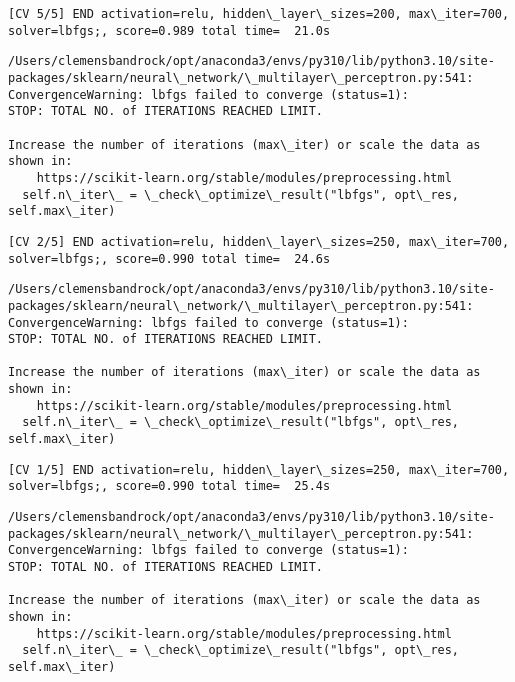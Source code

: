\documentclass[11pt]{article}
\begin{document}
    \begin{Verbatim}[commandchars=\\\{\}]
[CV 5/5] END activation=relu, hidden\_layer\_sizes=200, max\_iter=700,
solver=lbfgs;, score=0.989 total time=  21.0s
    \end{Verbatim}

    \begin{Verbatim}[commandchars=\\\{\}]
/Users/clemensbandrock/opt/anaconda3/envs/py310/lib/python3.10/site-
packages/sklearn/neural\_network/\_multilayer\_perceptron.py:541:
ConvergenceWarning: lbfgs failed to converge (status=1):
STOP: TOTAL NO. of ITERATIONS REACHED LIMIT.

Increase the number of iterations (max\_iter) or scale the data as shown in:
    https://scikit-learn.org/stable/modules/preprocessing.html
  self.n\_iter\_ = \_check\_optimize\_result("lbfgs", opt\_res, self.max\_iter)
    \end{Verbatim}

    \begin{Verbatim}[commandchars=\\\{\}]
[CV 2/5] END activation=relu, hidden\_layer\_sizes=250, max\_iter=700,
solver=lbfgs;, score=0.990 total time=  24.6s
    \end{Verbatim}

    \begin{Verbatim}[commandchars=\\\{\}]
/Users/clemensbandrock/opt/anaconda3/envs/py310/lib/python3.10/site-
packages/sklearn/neural\_network/\_multilayer\_perceptron.py:541:
ConvergenceWarning: lbfgs failed to converge (status=1):
STOP: TOTAL NO. of ITERATIONS REACHED LIMIT.

Increase the number of iterations (max\_iter) or scale the data as shown in:
    https://scikit-learn.org/stable/modules/preprocessing.html
  self.n\_iter\_ = \_check\_optimize\_result("lbfgs", opt\_res, self.max\_iter)
    \end{Verbatim}

    \begin{Verbatim}[commandchars=\\\{\}]
[CV 1/5] END activation=relu, hidden\_layer\_sizes=250, max\_iter=700,
solver=lbfgs;, score=0.990 total time=  25.4s
    \end{Verbatim}

    \begin{Verbatim}[commandchars=\\\{\}]
/Users/clemensbandrock/opt/anaconda3/envs/py310/lib/python3.10/site-
packages/sklearn/neural\_network/\_multilayer\_perceptron.py:541:
ConvergenceWarning: lbfgs failed to converge (status=1):
STOP: TOTAL NO. of ITERATIONS REACHED LIMIT.

Increase the number of iterations (max\_iter) or scale the data as shown in:
    https://scikit-learn.org/stable/modules/preprocessing.html
  self.n\_iter\_ = \_check\_optimize\_result("lbfgs", opt\_res, self.max\_iter)
    \end{Verbatim}
\end{document}
